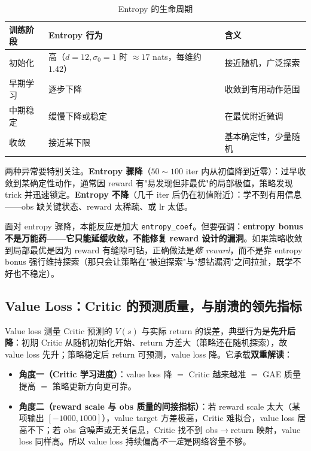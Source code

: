 \begin{table}[H]
\centering
\caption{Entropy 的生命周期}
\label{tab:rlmc-diag-entropy-life}
\begin{tabular}{p{2.6cm}p{4.4cm}p{5.0cm}}
\hline
训练阶段 & Entropy 行为 & 含义 \\
\hline
初始化 & 高（$d=12,\sigma_0=1$ 时 $\approx 17$ nats，每维约 $1.42$） & 接近随机，广泛探索 \\
早期学习 & 逐步下降 & 收敛到有用动作范围 \\
中期稳定 & 缓慢下降或稳定 & 在最优附近微调 \\
收敛 & 接近某下限 & 基本确定性，少量随机 \\
\hline
\end{tabular}
\end{table}

两种异常要特别关注。\textbf{Entropy 骤降}（$50\sim100$ iter 内从初值降到近零）：过早收敛到某确定性动作，通常因 reward 有"易发现但非最优"的局部极值，策略发现 trick 并迅速锁定。\textbf{Entropy 不降}（几千 iter 后仍在初值附近）：学不到有用信息——obs 缺关键状态、reward 太稀疏、或 lr 太低。

\begin{insight}\label{ins:rlmc-diag-entcoef}
面对 entropy 骤降，本能反应是加大 \verb|entropy_coef|。但要强调：\textbf{entropy bonus 不是万能药——它只能延缓收敛，不能修复 reward 设计的漏洞}。如果策略收敛到局部最优是因为 reward 有缝隙可钻，正确做法是\emph{修 reward}，而不是靠 entropy bonus 强行维持探索（那只会让策略在"被迫探索"与"想钻漏洞"之间拉扯，既学不好也不稳定）。
\end{insight}

\subsection{Value Loss：Critic 的预测质量，与崩溃的领先指标}

Value loss 测量 Critic 预测的 $V(s)$ 与实际 return 的误差，典型行为是\textbf{先升后降}：初期 Critic 从随机初始化开始、return 方差大（策略还在随机探索），故 value loss 先升；策略稳定后 return 可预测，value loss 降。它承载\textbf{双重解读}：

\begin{itemize}
  \item \textbf{角度一（Critic 学习进度）}：value loss 降 $=$ Critic 越来越准 $=$ GAE 质量提高 $=$ 策略更新方向更可靠。
  \item \textbf{角度二（reward scale 与 obs 质量的间接指标）}：若 reward scale 太大（某项输出 $[-1000,1000]$），value target 方差极高，Critic 难拟合，value loss 居高不下；若 obs 含噪声或无关信息，Critic 找不到 obs$\to$return 映射，value loss 同样高。所以 value loss 持续偏高\emph{不一定}是网络容量不够。
\end{itemize}

